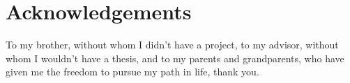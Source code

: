 
\chapter*{Acknowledgements}

To my brother, without whom I didn't have a project, to my advisor, without whom I wouldn't have a thesis, and to my parents and grandparents, who have given me the freedom to pursue my path in life, thank you.

